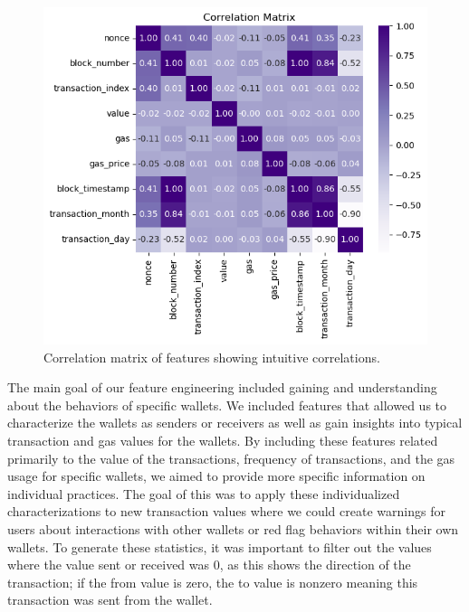 \documentclass[sigconf]{acmart}
\begin{document}
\begin{figure}[H]
    \centering
    \includegraphics[width=0.8\linewidth]{M4-correlation-matrix.png}
    \caption{Correlation matrix of features showing intuitive correlations.}
    \label{fig:m4CorrelationMatrix}
\end{figure}

The main goal of our feature engineering included gaining and understanding about the behaviors of specific wallets. We included features that allowed us to characterize the wallets as senders or receivers as well as gain insights into typical transaction and gas values for the wallets. By including these features related primarily to the value of the transactions, frequency of transactions, and the gas usage for specific wallets, we aimed to provide more specific information on individual practices. The goal of this was to apply these individualized characterizations to new transaction values where we could create warnings for users about interactions with other wallets or red flag behaviors within their own wallets. To generate these statistics, it was important to filter out the values where the value sent or received was 0, as this shows the direction of the transaction; if the from value is zero, the to value is nonzero meaning this transaction was sent from the wallet. 
\end{document}
